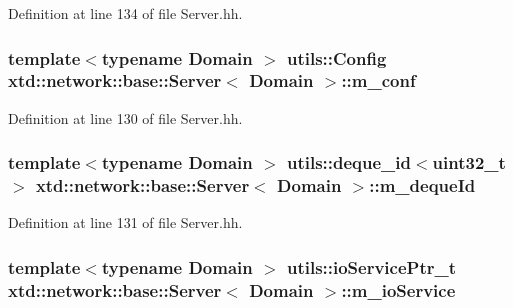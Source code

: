 Definition at line 134 of file Server.\-hh.

\hypertarget{classxtd_1_1network_1_1base_1_1Server_a5465aab6a4cbdaa664eeaf9eef6da5ac}{
\subsubsection[{m\-\_\-conf}]{\setlength{\rightskip}{0pt plus 5cm}template$<$typename Domain $>$ {\bf utils\-::\-Config} {\bf xtd\-::network\-::base\-::\-Server}$<$ Domain $>$\-::m\-\_\-conf\hspace{0.3cm}{\ttfamily [protected]}}}\label{classxtd_1_1network_1_1base_1_1Server_a5465aab6a4cbdaa664eeaf9eef6da5ac}


Definition at line 130 of file Server.\-hh.

\hypertarget{classxtd_1_1network_1_1base_1_1Server_a5092eab162e1e793aaeac42368c5c06f}{
\subsubsection[{m\-\_\-deque\-Id}]{\setlength{\rightskip}{0pt plus 5cm}template$<$typename Domain $>$ {\bf utils\-::deque\-\_\-id}$<$uint32\-\_\-t$>$ {\bf xtd\-::network\-::base\-::\-Server}$<$ Domain $>$\-::m\-\_\-deque\-Id\hspace{0.3cm}{\ttfamily [protected]}}}\label{classxtd_1_1network_1_1base_1_1Server_a5092eab162e1e793aaeac42368c5c06f}


Definition at line 131 of file Server.\-hh.

\hypertarget{classxtd_1_1network_1_1base_1_1Server_a2b67486dfc934466300fa48295f94b46}{
\subsubsection[{m\-\_\-io\-Service}]{\setlength{\rightskip}{0pt plus 5cm}template$<$typename Domain $>$ {\bf utils\-::io\-Service\-Ptr\-\_\-t} {\bf xtd\-::network\-::base\-::\-Server}$<$ Domain $>$\-::m\-\_\-io\-Service\hspace{0.3cm}{\ttfamily [protected]}}}\label{classxtd_1_1network_1_1base_1_1Server_a2b67486dfc934466300fa48295f94b46}


